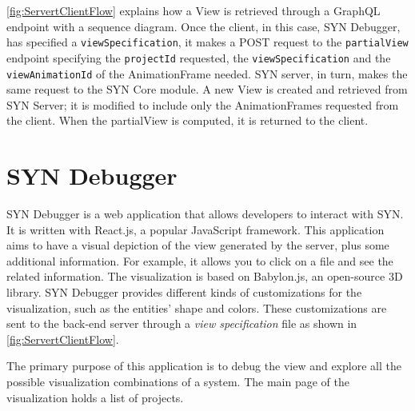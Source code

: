 \autoref{fig:ServertClientFlow} explains how a View is retrieved through a GraphQL endpoint with a sequence diagram. Once the client, in this case, SYN Debugger, has specified a \texttt{viewSpecification}, it makes a POST request to the 
\texttt{partialView} endpoint specifying the \texttt{projectId} requested, the \texttt{viewSpecification} and the \texttt{viewAnimationId} of the AnimationFrame needed. SYN server, in turn, makes the same request to the SYN Core module. A new View is created and retrieved from SYN Server; it is modified to include only the AnimationFrames requested from the client. When the partialView is computed, it is returned to the client. 


\section{SYN Debugger}

SYN Debugger is a web application that allows developers to interact with SYN. It is written with React.js, a popular JavaScript framework. 
This application aims to have a visual depiction of the view generated by the server, plus some additional information. 
For example, it allows you to click on a file and see the related information. 
The visualization is based on Babylon.js, an open-source 3D library. 
SYN Debugger provides different kinds of customizations for the visualization, such as the entities' shape and colors. 
These customizations are sent to the back-end server through a {\em view specification} file as shown in \autoref{fig:ServertClientFlow}. 

The primary purpose of this application is to debug the view and explore all the possible visualization combinations of a system.
The main page of the visualization holds a list of projects.

